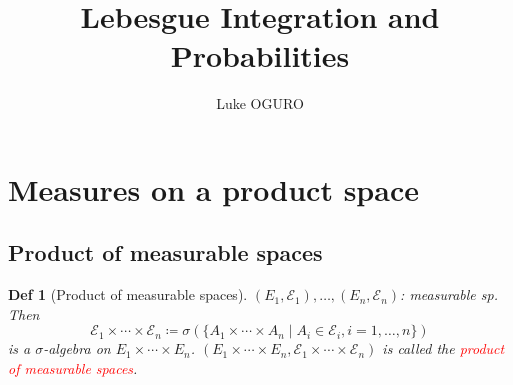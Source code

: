 \documentclass{article}
\newcommand{\red}[1]{\textcolor{red}{#1}}
\theoremstyle{mystyle}
\newtheorem{dfn}{Def}[section]
\begin{document}
\title{Lebesgue Integration and Probabilities}
\author{Luke OGURO}
\maketitle

\tableofcontents

\section{Measures on a product space}
\subsection{Product of measurable spaces}
\begin{dfn}[Product of measurable spaces]
  $(E_1, \mathcal{E}_1), \dots, (E_n, \mathcal{E}_n)$: measurable sp.\\
  Then 
  \begin{equation}
    \mathcal{E}_1 \times \cdots \times \mathcal{E}_n \coloneqq 
    \sigma(\{A_1 \times \cdots \times A_n \mid A_i \in \mathcal{E}_i, i=1, \dots, n\}) 
  \end{equation}
  is a $\sigma$-algebra on $E_1 \times \cdots \times E_n$. 
  $(E_1 \times \cdots \times E_n, \mathcal{E}_1 \times \cdots \times \mathcal{E}_n)$ 
  is called the \red{product of measurable spaces}.
\end{dfn}



\end{document}
